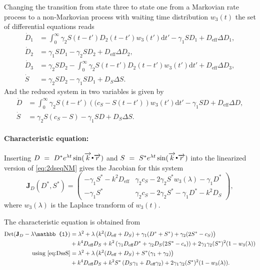 Changing the transition from state three to state one from a Markovian rate process to a non-Markovian process with waiting time distribution $w_3(t)$ the set of differential equations reads 
%
\begin{align}
\nonumber \dot{D}_1 &= \int_0^\infty \gamma_2 S(t-t')D_2(t-t')w_3(t')\mathrm dt'-\gamma_1 S D_1 + D_{\text{eff}}\Delta D_1,\\
\nonumber \dot{D}_2 &= \gamma_1 S D_1-\gamma_2 S D_2 + D_{\text{eff}}\Delta D_2,\\
\nonumber \dot{D}_3 &= \gamma_2 S D_2-\int_0^\infty \gamma_2 S(t-t')D_2(t-t')w_3(t')\mathrm dt' + D_{\text{eff}}\Delta D_3,\\
 \dot{S} &= \gamma_2 S D_2-\gamma_1 S D_1 + D_S\Delta S.
\label{eq:4dseqNM}
\end{align}
%
And the reduced system in two variables is given by
%
\begin{align}
\nonumber \dot{D} &= \int_0^\infty \gamma_2 S(t-t')\left((c_S-S(t-t')\right)w_3(t')\mathrm dt'-\gamma_1 S D + D_{\text{eff}} \Delta D,\\
\dot{S} &= \gamma_2 S \left(c_S-S\right)-\gamma_1 S D + D_S \Delta S. 
 \label{eq:2dseqNM}
\end{align}

\paragraph{Characteristic equation:}

Inserting $D~=~D^*e^{\lambda t}\sin( \overrightarrow{k}{\scriptscriptstyle \stackrel{\bullet}{{}}}\overrightarrow{r})$ and $S~=~S^*e^{\lambda t}\sin( \overrightarrow{k}{\scriptscriptstyle \stackrel{\bullet}{{}}}\overrightarrow{r})$ into the linearized version of \eqref{eq:2dseqNM} gives the Jacobian for this system
%
\begin{equation*}
 \mathbf{J}_D(D^*,S^*) = 
 \begin{pmatrix}
   -\gamma_1 S^*-k^2 D_{\text{eff}} & \gamma_2 c_S-2\gamma_2 S^* w_3(\lambda)-\gamma_1 D^*\\ 
   -\gamma_1 S^* &  \gamma_2 c_S -2\gamma_2 S^*-\gamma_1 D^*-k^2 D_S
 \end{pmatrix},
\end{equation*}
%
where $w_3(\lambda)$ is the Laplace transform of $w_3(t)$.

The characteristic equation is obtained from
%
\begin{align}
 \nonumber \Det(\mathbf{J}_D-\lambda\mathbb{1})&=\lambda^2+\lambda\left(k^2(D_{\text{eff}}+D_S)+\gamma_1 (D^*+S^*)+\gamma_2 (2 S^* - c_S)\right)\\
 \nonumber &+ k^4 D_{\text{eff}} D_S + k^2 \left(\gamma_1 D_{\text{eff}} D^*+\gamma_2 D_S (2 S^*-c_s)\right)+2 \gamma_1\gamma_2 (S^*)^2 (1-w_3(\lambda))\\
 \nonumber \mbox{using \eqref{eq:DssS}}&= \lambda^2+\lambda\left(k^2(D_{\text{eff}}+D_S)+S^*(\gamma_1+\gamma_2)\right)\\
  &+k^4 D_{\text{eff}} D_S+k^2 S^*\left(D_S\gamma_1+D_{\text{eff}}\gamma_2\right)+2 \gamma_1\gamma_2 (S^*)^2 (1-w_3(\lambda)).
\end{align}
%

